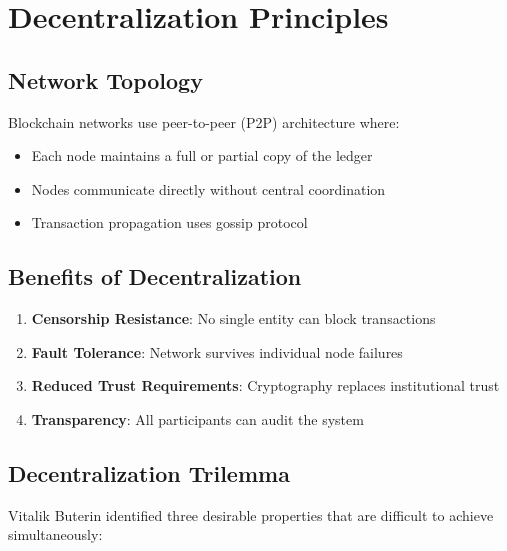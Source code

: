 \documentclass[11pt,a4paper]{article}
\begin{document}
\section{Decentralization Principles}

\subsection{Network Topology}

Blockchain networks use peer-to-peer (P2P) architecture where:
\begin{itemize}
  \item Each node maintains a full or partial copy of the ledger
  \item Nodes communicate directly without central coordination
  \item Transaction propagation uses gossip protocol
\end{itemize}

\subsection{Benefits of Decentralization}

\begin{enumerate}
  \item \textbf{Censorship Resistance}: No single entity can block transactions
  \item \textbf{Fault Tolerance}: Network survives individual node failures
  \item \textbf{Reduced Trust Requirements}: Cryptography replaces institutional trust
  \item \textbf{Transparency}: All participants can audit the system
\end{enumerate}

\subsection{Decentralization Trilemma}

Vitalik Buterin identified three desirable properties that are difficult to achieve simultaneously:

\begin{center}
\end{center}
\end{document}
